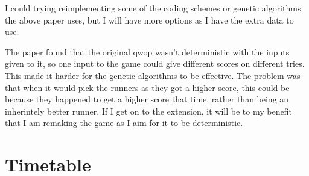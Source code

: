\documentclass[12pt,a4paper,twoside]{article}
\begin{document}
I could trying reimplementing some of the coding schemes or genetic algorithms the above paper uses, but I will have more options as I have the extra data to use.

The paper found that the original qwop wasn't deterministic with the inputs given to it, so one input to the game could give different scores on different tries. This made it harder for the genetic algorithms to be effective. 
The problem was that when it would pick the runners as they got a higher score, this could be because they happened to get a higher score that time, rather than being an inherintely better runner.
If I get on to the extension, it will be to my benefit that I am remaking the game as I aim for it to be deterministic.


\section*{Timetable}


\end{document}
